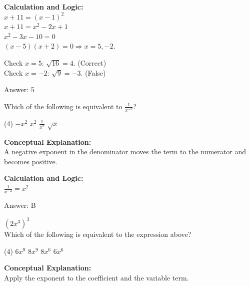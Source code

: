 \documentclass[11pt,paper=a4,answers]{exam}
\begin{document}
\begin{questions}
\begin{solution}
\textbf{Calculation and Logic:} \\
$x+11 = (x-1)^2$ \\
$x+11 = x^2 - 2x + 1$ \\
$x^2 - 3x - 10 = 0$ \\
$(x-5)(x+2) = 0 \Rightarrow x=5, -2$.

\vspace{10pt}

Check $x=5$: $\sqrt{16} = 4$. (Correct) \\
Check $x=-2$: $\sqrt{9} = -3$. (False)

\vspace{25pt}

Answer: \colorbox{yellow!100}{5}
\end{solution}

\vspace{40pt}

\question
Which of the following is equivalent to $\frac{1}{x^{-2}}$?
\begin{tasks}(4)
    \task $-x^2$
    \task $x^2$
    \task $\frac{1}{x^2}$
    \task $\sqrt{x}$
\end{tasks}

\begin{solution}
\textbf{Conceptual Explanation:} \\
A negative exponent in the denominator moves the term to the numerator and becomes positive.

\vspace{20pt}

\textbf{Calculation and Logic:} \\
$\frac{1}{x^{-2}} = x^2$

\vspace{25pt}

Answer: \colorbox{yellow!100}{B}
\end{solution}

\vspace{40pt}

\question
$(2x^3)^3$ \\
Which of the following is equivalent to the expression above?
\begin{tasks}(4)
    \task $6x^9$
    \task $8x^9$
    \task $8x^6$
    \task $6x^6$
\end{tasks}

\begin{solution}
\textbf{Conceptual Explanation:} \\
Apply the exponent to the coefficient and the variable term.


\end{solution}
\end{questions}
\end{document}
